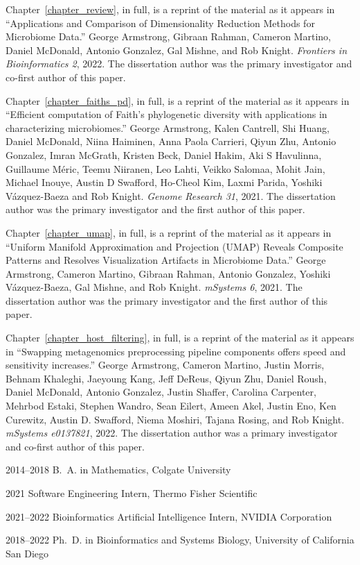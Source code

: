 \begin{frontmatter}
\begin{acknowledgements}
Chapter~\ref{chapter_review}, in full, is a reprint of the material as it appears in ``Applications and Comparison of Dimensionality Reduction Methods for Microbiome Data.'' George Armstrong, Gibraan Rahman, Cameron Martino, Daniel McDonald, Antonio Gonzalez, Gal Mishne, and Rob Knight. \textit{Frontiers in Bioinformatics 2}, 2022. The dissertation author was the primary investigator and co-first author of this paper.

Chapter~\ref{chapter_faiths_pd}, in full, is a reprint of the material as it appears in ``Efficient computation of Faith's phylogenetic diversity with applications in characterizing microbiomes.'' George Armstrong, Kalen Cantrell, Shi Huang, Daniel McDonald, Niina Haiminen, Anna Paola Carrieri, Qiyun Zhu, Antonio Gonzalez, Imran McGrath, Kristen Beck, Daniel Hakim, Aki S Havulinna, Guillaume Méric, Teemu Niiranen, Leo Lahti, Veikko Salomaa, Mohit Jain, Michael Inouye, Austin D Swafford, Ho-Cheol Kim, Laxmi Parida, Yoshiki Vázquez-Baeza and Rob Knight. \textit{Genome Research 31}, 2021. The dissertation author was the primary investigator and the first author of this paper.

Chapter~\ref{chapter_umap}, in full, is a reprint of the material as it appears in ``Uniform Manifold Approximation and Projection (UMAP) Reveals Composite Patterns and Resolves Visualization Artifacts in Microbiome Data.'' George Armstrong, Cameron Martino, Gibraan Rahman, Antonio Gonzalez, Yoshiki Vázquez-Baeza, Gal Mishne, and Rob Knight.  \textit{mSystems 6}, 2021. The dissertation author was the primary investigator and the first author of this paper.

Chapter~\ref{chapter_host_filtering}, in full, is a reprint of the material as it appears in ``Swapping metagenomics preprocessing pipeline components offers speed and sensitivity increases.'' George Armstrong, Cameron Martino, Justin Morris, Behnam Khaleghi, Jaeyoung Kang, Jeff DeReus, Qiyun Zhu, Daniel Roush, Daniel McDonald, Antonio Gonzalez, Justin Shaffer, Carolina Carpenter, Mehrbod Estaki, Stephen Wandro, Sean Eilert, Ameen Akel, Justin Eno, Ken Curewitz, Austin D. Swafford, Niema Moshiri, Tajana Rosing, and Rob Knight. \textit{mSystems e0137821}, 2022. The dissertation author was a primary investigator and co-first author of this paper.


\end{acknowledgements}


%
%
\begin{vitapage}
\begin{vita}
  \item[2014--2018] B.~A. in Mathematics, Colgate University
  \item[2021] Software Engineering Intern, Thermo Fisher Scientific
  \item[2021--2022] Bioinformatics Artificial Intelligence Intern, NVIDIA Corporation
  \item[2018--2022] Ph.~D. in Bioinformatics and Systems Biology, University of California San Diego
\end{vita}



\end{vitapage}
\end{frontmatter}
